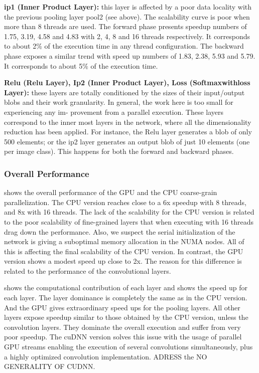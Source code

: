 \textbf{ip1 (Inner Product Layer):} this layer is affected by a poor data
locality with the previous pooling layer pool2 (see above). The
scalability curve is poor when more than 8 threads are used. The
forward phase presents speedup numbers of 1.75, 3.19, 4.58 and
4.83 with 2, 4, 8 and 16 threads respectively. It corresponds to
about 2\% of the execution time in any thread configuration. The
backward phase exposes a similar trend with speed up numbers of
1.83, 2.38, 5.93 and 5.79. It corresponds to about 5\% of the execution time.

\textbf{Relu (Relu Layer), Ip2 (Inner Product Layer), Loss (Softmaxwithloss Layer):} these layers are totally conditioned by the
sizes of their input/output blobs and their work granularity. In
general, the work here is too small for experiencing any im-
provement from a parallel execution. These layers correspond to
the inner most layers in the network, where all the dimensionality
reduction has been applied. For instance, the Relu layer generates
a blob of only 500 elements; or the ip2 layer generates an output
blob of just 10 elements (one per image class). This happens for
both the forward and backward phases.

\subsubsection{Overall Performance}
 shows the overall performance of
the GPU and the CPU coarse-grain parallelization. The CPU
version reaches close to a 6x speedup with 8 threads, and 8x with
16 threads. The lack of the scalability for the CPU version is
related to the poor scalability of fine-grained layers that when
executing with 16 threads drag down the performance. Also, we
suspect the serial initialization of the network is giving a suboptimal memory allocation in the NUMA nodes. All of this is affecting the final scalability of the CPU version. In contrast, the GPU
version shows a modest speed up close to 2x. The reason for this
difference is related to the performance of the convolutional layers.

 shows the computational contribution of each layer and  shows the
speed up for each layer. The layer dominance is completely the
same as in the CPU version. And the GPU gives extraordinary
speed ups for the pooling layers. All other layers expose speedup
similar to those obtained by the CPU version, unless the convolution layers. They dominate the overall execution and suffer from
very poor speedup. The cuDNN version solves this issue with the
usage of parallel GPU streams enabling the execution of several
convolutions simultaneously, plus a highly optimized convolution
implementation. ADRESS the NO GENERALITY OF CUDNN.

